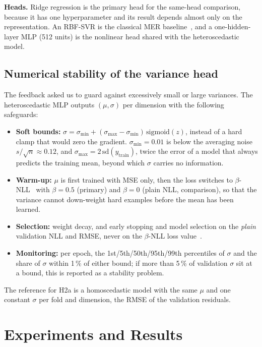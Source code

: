 \documentclass[conference]{IEEEtran}
\begin{document}
\textbf{Heads.} Ridge regression is the primary head for the same-head
comparison, because it has one hyperparameter and its result depends almost
only on the representation. An RBF-SVR is the classical MER
baseline~\cite{yang2008}, and a one-hidden-layer MLP (512 units) is the
nonlinear head shared with the heteroscedastic model.

\subsection{Numerical stability of the variance head}
\label{sec:stability}
The feedback asked us to guard against excessively small or large variances.
The heteroscedastic MLP outputs $(\mu, \sigma)$ per dimension with the
following safeguards:
\begin{itemize}
\item \textbf{Soft bounds:} $\sigma = \sigma_{\min} + (\sigma_{\max}-\sigma_{\min})\,\mathrm{sigmoid}(z)$,
instead of a hard clamp that would zero the gradient. $\sigma_{\min}=0.01$ is
below the averaging noise $s/\sqrt n\approx0.12$, and $\sigma_{\max}=2\,\mathrm{sd}(y_{\text{train}})$,
twice the error of a model that always predicts the training mean, beyond
which $\sigma$ carries no information.
\item \textbf{Warm-up:} $\mu$ is first trained with MSE only, then the loss
switches to $\beta$-NLL~\cite{seitzer2022} with $\beta=0.5$ (primary) and
$\beta=0$ (plain NLL, comparison), so that the variance cannot down-weight
hard examples before the mean has been learned.
\item \textbf{Selection:} weight decay, and early stopping and model selection
on the \emph{plain} validation NLL and RMSE, never on the $\beta$-NLL loss
value~\cite{seitzer2022}.
\item \textbf{Monitoring:} per epoch, the 1st/5th/50th/95th/99th percentiles of
$\sigma$ and the share of $\sigma$ within 1\,\% of either bound; if more than
5\,\% of validation $\sigma$ sit at a bound, this is reported as a stability
problem.
\end{itemize}
The reference for H2a is a homoscedastic model with the same $\mu$ and one
constant $\sigma$ per fold and dimension, the RMSE of the validation residuals.

\section{Experiments and Results}
\label{sec:results}
\end{document}
